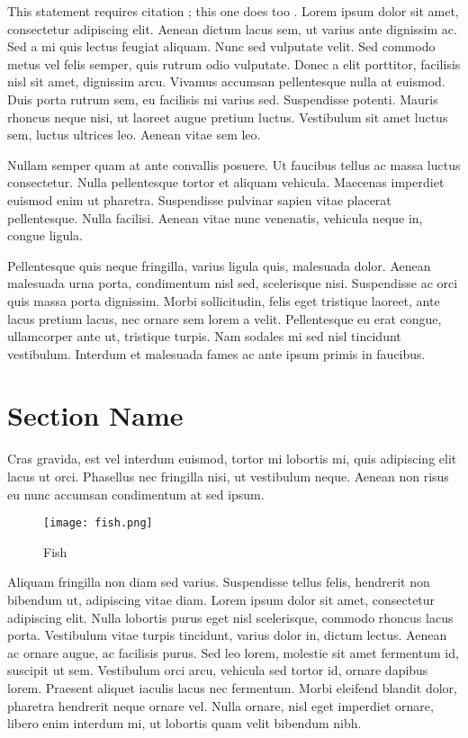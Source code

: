 \documentclass[a4paper,11pt]{article}
\begin{document}
This statement requires citation \cite{Smith:2012qr}; this one does too \cite{Smith:2013jd}. Lorem ipsum dolor sit amet, consectetur adipiscing elit. Aenean dictum lacus sem, ut varius ante dignissim ac. Sed a mi quis lectus feugiat aliquam. Nunc sed vulputate velit. Sed commodo metus vel felis semper, quis rutrum odio vulputate. Donec a elit porttitor, facilisis nisl sit amet, dignissim arcu. Vivamus accumsan pellentesque nulla at euismod. Duis porta rutrum sem, eu facilisis mi varius sed. Suspendisse potenti. Mauris rhoncus neque nisi, ut laoreet augue pretium luctus. Vestibulum sit amet luctus sem, luctus ultrices leo. Aenean vitae sem leo.

Nullam semper quam at ante convallis posuere. Ut faucibus tellus ac massa luctus consectetur. Nulla pellentesque tortor et aliquam vehicula. Maecenas imperdiet euismod enim ut pharetra. Suspendisse pulvinar sapien vitae placerat pellentesque. Nulla facilisi. Aenean vitae nunc venenatis, vehicula neque in, congue ligula.

Pellentesque quis neque fringilla, varius ligula quis, malesuada dolor. Aenean malesuada urna porta, condimentum nisl sed, scelerisque nisi. Suspendisse ac orci quis massa porta dignissim. Morbi sollicitudin, felis eget tristique laoreet, ante lacus pretium lacus, nec ornare sem lorem a velit. Pellentesque eu erat congue, ullamcorper ante ut, tristique turpis. Nam sodales mi sed nisl tincidunt vestibulum. Interdum et malesuada fames ac ante ipsum primis in faucibus.


\section*{Section Name}

Cras gravida, est vel interdum euismod, tortor mi lobortis mi, quis adipiscing elit lacus ut orci. Phasellus nec fringilla nisi, ut vestibulum neque. Aenean non risus eu nunc accumsan condimentum at sed ipsum.
\begin{wrapfigure}{l}{0.4\textwidth} %
\begin{center}
\texttt{[image: fish.png]}
\end{center}
\caption{Fish}
\end{wrapfigure}
Aliquam fringilla non diam sed varius. Suspendisse tellus felis, hendrerit non bibendum ut, adipiscing vitae diam. Lorem ipsum dolor sit amet, consectetur adipiscing elit. Nulla lobortis purus eget nisl scelerisque, commodo rhoncus lacus porta. Vestibulum vitae turpis tincidunt, varius dolor in, dictum lectus. Aenean ac ornare augue, ac facilisis purus. Sed leo lorem, molestie sit amet fermentum id, suscipit ut sem. Vestibulum orci arcu, vehicula sed tortor id, ornare dapibus lorem. Praesent aliquet iaculis lacus nec fermentum. Morbi eleifend blandit dolor, pharetra hendrerit neque ornare vel. Nulla ornare, nisl eget imperdiet ornare, libero enim interdum mi, ut lobortis quam velit bibendum nibh.
\end{document}
